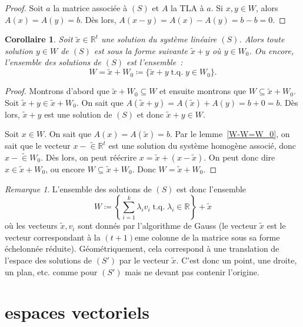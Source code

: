 \documentclass{article}
\DeclareMathOperator{\tq}{\text{ t.q. }}
\newcommand{\R}{\mathbb R}
\newtheorem{cor}[thm]{Corollaire}
\theoremstyle{definition}
\theoremstyle{remark}
\newtheorem*{rmq}{Remarque}
\begin{document}
		\begin{proof} Soit $a$ la matrice associée à $(S)$ et $A$ la TLA à $a$. Si $x, y \in W$, alors $A(x) = A(y) = b$. Dès lors, $A(x-y) = A(x) - A(y) = b-b = 0$.
		\end{proof}

		\begin{cor} Soit $\widetilde x \in \R^t$ une solution du système linéaire $(S)$. Alors toute solution $y \in W$ de $(S)$ est sous la forme suivante
		$\widetilde x + y$ où $y \in W_0$. Ou encore, l'ensemble des solutions de $(S)$ est l'ensemble~:
		\[W = \widetilde x + W_0 \coloneqq \{\widetilde x + y \tq y \in W_0\}.\] \end{cor}

		\begin{proof} Montrons d'abord que $\widetilde x + W_0 \subseteq W$ et ensuite montrons que $W \subseteq \widetilde x + W_0$. Soit
		$\widetilde x + y \in \widetilde x + W_0$. On sait que $A(\widetilde x + y) = A(\widetilde x) + A(y) = b + 0 = b$. Dès lors, $\widetilde x + y$ est une
		solution de $(S)$ et donc $\widetilde x + y \in W$.

		Soit $x \in W$. On sait que $A(x) = A(\widetilde x) = b$. Par le lemme~\ref{W-W=W_0}, on sait que le vecteur $x-\widetilde \in \R^t$ est une solution du système
		homogène associé, donc $x-\widetilde \in W_0$. Dès lors, on peut réécrire $x = \widetilde x + (x-\widetilde x)$. On peut donc dire $x \in \widetilde x + W_0$, ou
		encore $W \subseteq \widetilde x + W_0$. Donc $W = \widetilde x + W_0$. \end{proof}

		\begin{rmq} L'ensemble des solutions de $(S)$ est donc l'ensemble \[W \coloneqq \left\{\sum_{i=1}^k\lambda_iv_i \tq \lambda_i \in \R\right\} + \widetilde x\] où
		les vecteurs $\widetilde x, v_i$ sont donnés par l'algorithme de Gauss (le vecteur $\widetilde x$ est le vecteur correspondant à la $(t+1)$eme colonne de
		la matrice sous sa forme échelonnée réduite). Géométriquement, cela correspond à une translation de l'espace des solutions de $(S')$ par le vecteur
		$\widetilde x$. C'est donc un point, une droite, un plan, etc. comme pour $(S')$ mais ne devant pas contenir l'origine. \end{rmq}
	
\newpage
\section{espaces vectoriels}
\end{document}
